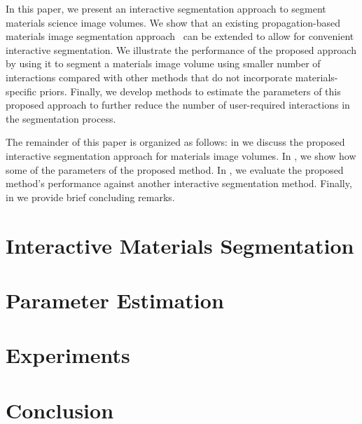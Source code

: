 \documentclass[]{spie}  %
\begin{document}
In this paper, we present an interactive segmentation approach to
segment materials science image volumes.  We show that an existing
propagation-based materials image segmentation
approach~\cite{waggoner:11} can be extended to allow for convenient
interactive segmentation.  We illustrate the performance of the
proposed approach by using it to segment a materials image volume
using smaller number of interactions compared with other methods that
do not incorporate materials-specific priors.  Finally, we develop
methods to estimate the parameters of this proposed approach to
further reduce the number of user-required interactions in the
segmentation process.

The remainder of this paper is organized as follows: in
 we discuss the proposed interactive segmentation
approach for materials image volumes. In , we show how
some of the parameters of the proposed method.  In , we
evaluate the proposed method's performance against another interactive
segmentation method.  Finally, in  we provide brief
concluding remarks.

\section{Interactive Materials Segmentation}
\label{sec:interactive}

\section{Parameter Estimation}
\label{sec:param}

\section{Experiments}
\label{sec:ex}

\section{Conclusion}
\label{sec:conclusion}


\end{document}
